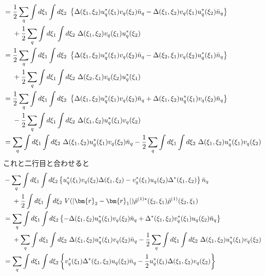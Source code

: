 \documentclass[dvipdfmx, 11pt, a4paper]{jsarticle}
\numberwithin{equation}{section}
\theoremstyle{definition}
\begin{document}
\begin{derivationBox}
\begin{align}
            &= \frac{1}{2}\sum_q\int d\xi_1\int d\xi_2\ \left\{   \Delta(\xi_1,\xi_2)u_q^*(\xi_1)v_q(\xi_2)\bar{n}_q -  \Delta(\xi_1,\xi_2)v_q(\xi_1)u_q^*(\xi_2) \bar{n}_q\right\}  \notag \\
            &\ \ \ \ +\frac{1}{2}\sum_q \int d\xi_1\int d\xi_2\ \Delta(\xi_1,\xi_2)v_q(\xi_1)u_q^*(\xi_2) \notag \\
            &= \frac{1}{2}\sum_q\int d\xi_1\int d\xi_2\ \left\{   \Delta(\xi_1,\xi_2)u_q^*(\xi_1)v_q(\xi_2)\bar{n}_q -  \Delta(\xi_2,\xi_1)v_q(\xi_2)u_q^*(\xi_1) \bar{n}_q\right\}  \notag \\
            &\ \ \ \ +\frac{1}{2}\sum_q \int d\xi_1\int d\xi_2\ \Delta(\xi_2,\xi_1)v_q(\xi_2)u_q^*(\xi_1)\notag \\
            &= \frac{1}{2}\sum_q\int d\xi_1\int d\xi_2\ \left\{   \Delta(\xi_1,\xi_2)u_q^*(\xi_1)v_q(\xi_2)\bar{n}_q +  \Delta(\xi_1,\xi_2)u_q^*(\xi_1)v_q(\xi_2) \bar{n}_q\right\}  \notag \\
            &\ \ \ \ -\frac{1}{2}\sum_q \int d\xi_1\int d\xi_2\ \Delta(\xi_1,\xi_2)u_q^*(\xi_1)v_q(\xi_2) \notag \\
            &= \sum_q\int d\xi_1\int d\xi_2\    \Delta(\xi_1,\xi_2)u_q^*(\xi_1)v_q(\xi_2)\bar{n}_q   - \frac{1}{2}\sum_q \int d\xi_1\int d\xi_2\ \Delta(\xi_1,\xi_2)u_q^*(\xi_1)v_q(\xi_2)
        \end{align}
        これと二行目と合わせると
        \begin{align}
            &-\sum_q  \int d\xi_1 \int d\xi_2 \left\{    u_q^*(\xi_1) v_q(\xi_2)\Delta (\xi_1,\xi_2)   -    v^*_q(\xi_1)u_q(\xi_2)\Delta^* (\xi_1,\xi_2) \right\}\bar{n}_q \notag \\
            &\ \ \ \ +\frac{1}{2}\int d\xi_1\int d\xi_2\ V(\left| \bm{r}_2-\bm{r}_1 \right|) \tilde{\rho}^{(1)*}(\xi_2,\xi_1) \tilde{\rho}^{(1)}(\xi_2,\xi_1) \notag \\
            &= \sum_q  \int d\xi_1 \int d\xi_2 \left\{  -  \Delta (\xi_1,\xi_2) u_q^*(\xi_1) v_q(\xi_2)\bar{n}_q  + \Delta^* (\xi_1,\xi_2)   v^*_q(\xi_1)u_q(\xi_2) \bar{n}_q\right\} \notag \\
            &\ \ \ \ +\sum_q\int d\xi_1\int d\xi_2\    \Delta(\xi_1,\xi_2)u_q^*(\xi_1)v_q(\xi_2)\bar{n}_q   - \frac{1}{2}\sum_q \int d\xi_1\int d\xi_2\ \Delta(\xi_1,\xi_2)u_q^*(\xi_1)v_q(\xi_2) \notag \\
            &= \sum_q \int d\xi_1 \int d\xi_2 \left\{ v^*_q(\xi_1)\Delta^* (\xi_1,\xi_2)   u_q(\xi_2) \bar{n}_q - \frac{1}{2} u_q^*(\xi_1)\Delta(\xi_1,\xi_2)v_q(\xi_2) \right\} \notag \\

\end{align}
\end{derivationBox}
\end{document}
